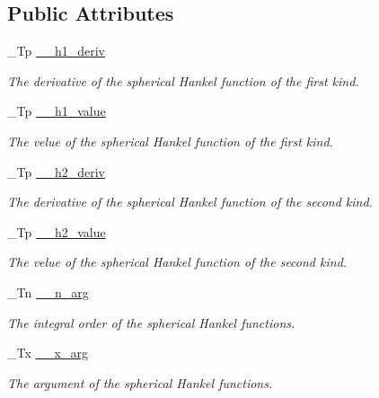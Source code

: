 \subsection*{Public Attributes}
\begin{DoxyCompactItemize}
\item 
\+\_\+\+Tp \hyperlink{struct____gnu__cxx_1_1____sph__hankel__t_a7b734a1eef61be0bee57ffafa4d9d17d}{\+\_\+\+\_\+h1\+\_\+deriv}
\begin{DoxyCompactList}\small\item\em The derivative of the spherical Hankel function of the first kind. \end{DoxyCompactList}\item 
\+\_\+\+Tp \hyperlink{struct____gnu__cxx_1_1____sph__hankel__t_aedd78dab2380f51554d4e4fabe4b88e6}{\+\_\+\+\_\+h1\+\_\+value}
\begin{DoxyCompactList}\small\item\em The velue of the spherical Hankel function of the first kind. \end{DoxyCompactList}\item 
\+\_\+\+Tp \hyperlink{struct____gnu__cxx_1_1____sph__hankel__t_a7b6cbd23f269cf3b0c76d1fc21bede4d}{\+\_\+\+\_\+h2\+\_\+deriv}
\begin{DoxyCompactList}\small\item\em The derivative of the spherical Hankel function of the second kind. \end{DoxyCompactList}\item 
\+\_\+\+Tp \hyperlink{struct____gnu__cxx_1_1____sph__hankel__t_a225e48ba2faafbdabd65cd173372d418}{\+\_\+\+\_\+h2\+\_\+value}
\begin{DoxyCompactList}\small\item\em The velue of the spherical Hankel function of the second kind. \end{DoxyCompactList}\item 
\+\_\+\+Tn \hyperlink{struct____gnu__cxx_1_1____sph__hankel__t_a43f671e87375a9077262676564df20c5}{\+\_\+\+\_\+n\+\_\+arg}
\begin{DoxyCompactList}\small\item\em The integral order of the spherical Hankel functions. \end{DoxyCompactList}\item 
\+\_\+\+Tx \hyperlink{struct____gnu__cxx_1_1____sph__hankel__t_a265ee0cdcca2d491c29b520a0fd4e4b3}{\+\_\+\+\_\+x\+\_\+arg}
\begin{DoxyCompactList}\small\item\em The argument of the spherical Hankel functions. \end{DoxyCompactList}\end{DoxyCompactItemize}


